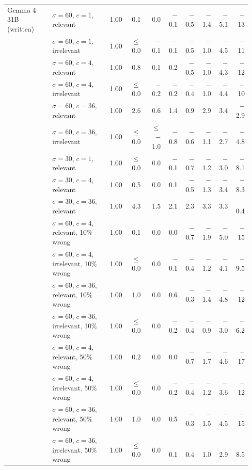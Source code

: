 \begin{tabular}{llrrrrrrrr}
\midrule
Gemma 4 31B (written) & $\sigma = 60$, $c = 1$, relevant & 1.00 & 0.1 & 0.0 & $-$0.1 & $-$0.5 & $-$1.4 & $-$5.1 & $-$13 \\
 & $\sigma = 60$, $c = 1$, irrelevant & 1.00 & $\leq$ 0.0 & $-$0.1 & $-$0.1 & $-$0.5 & $-$1.0 & $-$4.5 & $-$11 \\
 & $\sigma = 60$, $c = 4$, relevant & 1.00 & 0.8 & 0.1 & 0.2 & $-$0.5 & $-$1.0 & $-$4.3 & $-$12 \\
 & $\sigma = 60$, $c = 4$, irrelevant & 1.00 & $\leq$ 0.0 & $-$0.2 & $-$0.2 & $-$0.4 & $-$1.0 & $-$4.4 & $-$10 \\
 & $\sigma = 60$, $c = 36$, relevant & 1.00 & 2.6 & 0.6 & 1.4 & 0.9 & 2.9 & 3.4 & $-$2.9 \\
 & $\sigma = 60$, $c = 36$, irrelevant & 1.00 & $\leq$ 0.0 & $\leq$ $-$1.0 & $-$0.8 & $-$0.6 & $-$1.1 & $-$2.7 & $-$4.8 \\
 & $\sigma = 30$, $c = 1$, relevant & 1.00 & $\leq$ 0.0 & 0.0 & $-$0.1 & $-$0.7 & $-$1.2 & $-$3.0 & $-$8.1 \\
 & $\sigma = 30$, $c = 4$, relevant & 1.00 & 0.5 & 0.0 & 0.1 & $-$0.5 & $-$1.3 & $-$3.4 & $-$8.3 \\
 & $\sigma = 30$, $c = 36$, relevant & 1.00 & 4.3 & 1.5 & 2.1 & 2.3 & 3.3 & 3.3 & $-$0.4 \\
 & $\sigma = 60$, $c = 4$, relevant, 10\% wrong & 1.00 & 0.1 & 0.0 & 0.0 & $-$0.7 & $-$1.9 & $-$5.0 & $-$15 \\
 & $\sigma = 60$, $c = 4$, irrelevant, 10\% wrong & 1.00 & $\leq$ 0.0 & 0.0 & $-$0.1 & $-$0.4 & $-$1.2 & $-$4.1 & $-$9.5 \\
 & $\sigma = 60$, $c = 36$, relevant, 10\% wrong & 1.00 & 1.0 & 0.0 & 0.6 & $-$0.3 & $-$1.4 & $-$4.8 & $-$12 \\
 & $\sigma = 60$, $c = 36$, irrelevant, 10\% wrong & 1.00 & $\leq$ 0.0 & 0.0 & $-$0.2 & $-$0.4 & $-$0.9 & $-$3.0 & $-$6.2 \\
 & $\sigma = 60$, $c = 4$, relevant, 50\% wrong & 1.00 & 0.2 & 0.0 & 0.0 & $-$0.7 & $-$1.7 & $-$4.6 & $-$17 \\
 & $\sigma = 60$, $c = 4$, irrelevant, 50\% wrong & 1.00 & $\leq$ 0.0 & 0.0 & $-$0.2 & $-$0.4 & $-$1.2 & $-$3.6 & $-$12 \\
 & $\sigma = 60$, $c = 36$, relevant, 50\% wrong & 1.00 & 1.0 & 0.0 & 0.5 & $-$0.3 & $-$1.5 & $-$4.5 & $-$15 \\
 & $\sigma = 60$, $c = 36$, irrelevant, 50\% wrong & 1.00 & $\leq$ 0.0 & 0.0 & $-$0.1 & $-$0.4 & $-$1.0 & $-$2.9 & $-$8.5 \\
\bottomrule
\end{tabular}
